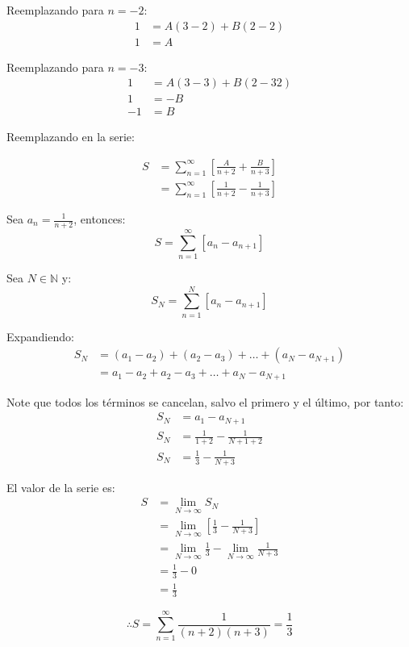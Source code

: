 \documentclass{article}
\begin{document}
Reemplazando para $n = -2$:
\begin{align*}
1 &= A (3 - 2) + B(2 - 2) \\
1 &= A 
\end{align*}

Reemplazando para $n = -3$:
\begin{align*}
1 &= A (3 - 3) + B(2 -32) \\
1 &= -B \\
-1 &= B 
\end{align*}

Reemplazando en la serie:

\begin{align*}
S &= \sum_{n = 1}^{\infty} \left[\frac{A}{n + 2} + \frac{B}{n + 3}\right] \\
&= \sum_{n = 1}^{\infty} \left[\frac{1}{n + 2} - \frac{1}{n + 3}\right]
\end{align*}

Sea $a_n = \frac{1}{n + 2}$, entonces:
\[
S = \sum_{n = 1}^{\infty} [a_n - a_{n + 1}]
\]

Sea $N \in \mathbb{N}$ y:
\[
S_N = \sum_{n = 1}^{N} [a_n - a_{n + 1}]
\]

Expandiendo:
\begin{align*}
S_N &= (a_1 - a_2) + (a_2 - a_3) + \ldots + (a_N - a_{N + 1}) \\
&= a_1 - a_2 + a_2 - a_3 + \ldots + a_N - a_{N + 1}
\end{align*}

Note que todos los términos se cancelan, salvo el primero y el último, por tanto:
\begin{align*}
S_N &= a_1 - a_{N + 1} \\
S_N &= \frac{1}{1 + 2} - \frac{1}{N + 1 + 2} \\
S_N &= \frac{1}{3} - \frac{1}{N + 3}
\end{align*}

El valor de la serie es:
\begin{align*}
S &= \lim_{N \to \infty} S_N \\
&= \lim_{N \to \infty} \left[\frac{1}{3} - \frac{1}{N + 3} \right] \\
&= \lim_{N \to \infty} \frac{1}{3} - \lim_{N \to \infty} \frac{1}{N + 3} \\
&= \frac{1}{3} - 0 \\
&= \boxed{\frac{1}{3}}
\end{align*}

\[
\therefore S = \sum_{n = 1}^{\infty} \frac{1}{(n + 2)(n + 3)} = \frac{1}{3}
\]
\end{document}
